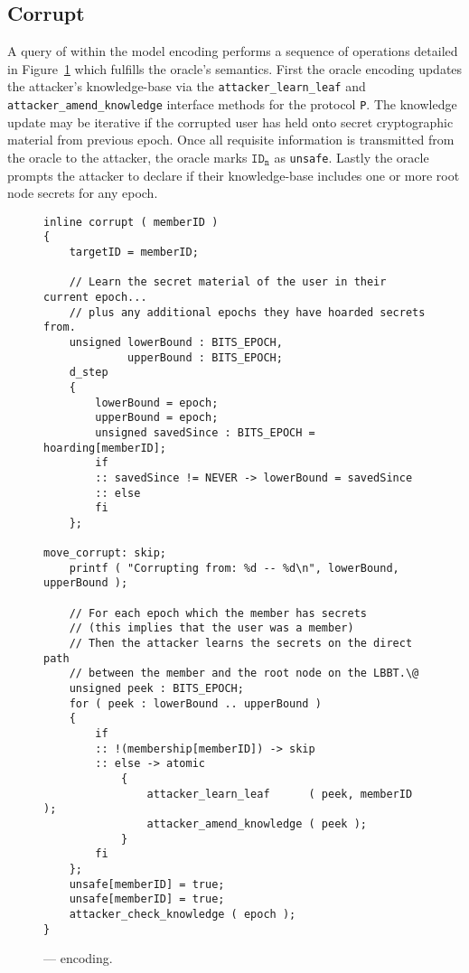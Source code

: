 \hypertarget{sec:corrupt}{%
\subsection{Corrupt}\label{sec:corrupt}}

A query of  within the  model encoding performs a sequence of operations detailed in Figure\ \ref{fig:Oracle-Corrupt} which fulfills the oracle's semantics.
First the oracle encoding updates the attacker's knowledge-base via the \texttt{attacker\_learn\_leaf} and \texttt{attacker\_amend\_knowledge} interface methods for the protocol \texttt{P}.
The knowledge update may be iterative if the corrupted user has held onto secret cryptographic material from previous epoch.
Once all requisite information is transmitted from the oracle to the attacker, the oracle marks \(\mathtt{ID_n}\) as \texttt{unsafe}.
Lastly the oracle prompts the attacker to declare if their knowledge-base includes one or more  root node secrets for any epoch.

\begin{figure}[ht!]
  \centering
  \caption{\label{fig:Oracle-Corrupt}\CGKAmod{}{}{} ---  encoding.}
\begin{verbatim}
inline corrupt ( memberID )
{
    targetID = memberID;

    // Learn the secret material of the user in their current epoch...
    // plus any additional epochs they have hoarded secrets from.
    unsigned lowerBound : BITS_EPOCH,
             upperBound : BITS_EPOCH;
    d_step
    {
        lowerBound = epoch;
        upperBound = epoch;
        unsigned savedSince : BITS_EPOCH = hoarding[memberID];
        if
        :: savedSince != NEVER -> lowerBound = savedSince
        :: else
        fi
    };

move_corrupt: skip;
    printf ( "Corrupting from: %d -- %d\n", lowerBound, upperBound );

    // For each epoch which the member has secrets
    // (this implies that the user was a member)
    // Then the attacker learns the secrets on the direct path
    // between the member and the root node on the LBBT.\@
    unsigned peek : BITS_EPOCH;
    for ( peek : lowerBound .. upperBound )
    {
        if
        :: !(membership[memberID]) -> skip
        :: else -> atomic
            {
                attacker_learn_leaf      ( peek, memberID );
                attacker_amend_knowledge ( peek );
            }
        fi
    };
    unsafe[memberID] = true;
    unsafe[memberID] = true;
    attacker_check_knowledge ( epoch );
}
\end{verbatim}
\end{figure}

